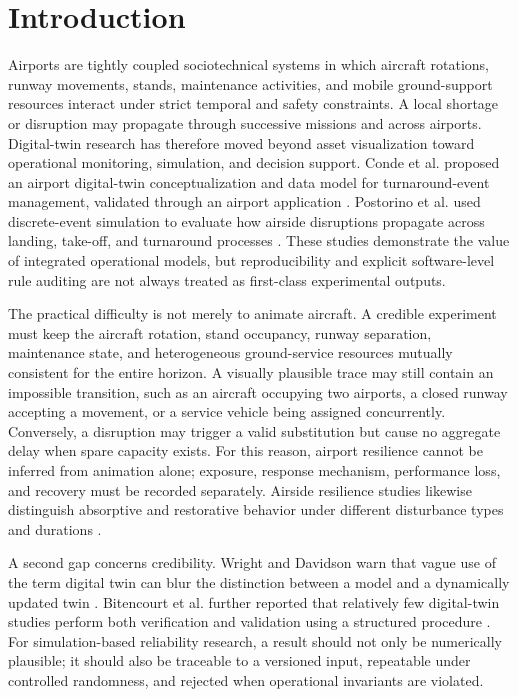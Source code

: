 \documentclass[runningheads]{llncs}
\begin{document}
\section{Introduction}
Airports are tightly coupled sociotechnical systems in which aircraft rotations, runway movements, stands, maintenance activities, and mobile ground-support resources interact under strict temporal and safety constraints. A local shortage or disruption may propagate through successive missions and across airports. Digital-twin research has therefore moved beyond asset visualization toward operational monitoring, simulation, and decision support. Conde et al. proposed an airport digital-twin conceptualization and data model for turnaround-event management, validated through an airport application \cite{conde2022}. Postorino et al. used discrete-event simulation to evaluate how airside disruptions propagate across landing, take-off, and turnaround processes \cite{postorino2020}. These studies demonstrate the value of integrated operational models, but reproducibility and explicit software-level rule auditing are not always treated as first-class experimental outputs.

The practical difficulty is not merely to animate aircraft. A credible experiment must keep the aircraft rotation, stand occupancy, runway separation, maintenance state, and heterogeneous ground-service resources mutually consistent for the entire horizon. A visually plausible trace may still contain an impossible transition, such as an aircraft occupying two airports, a closed runway accepting a movement, or a service vehicle being assigned concurrently. Conversely, a disruption may trigger a valid substitution but cause no aggregate delay when spare capacity exists. For this reason, airport resilience cannot be inferred from animation alone; exposure, response mechanism, performance loss, and recovery must be recorded separately. Airside resilience studies likewise distinguish absorptive and restorative behavior under different disturbance types and durations \cite{mantecchini2023}.

A second gap concerns credibility. Wright and Davidson warn that vague use of the term digital twin can blur the distinction between a model and a dynamically updated twin \cite{wright2020}. Bitencourt et al. further reported that relatively few digital-twin studies perform both verification and validation using a structured procedure \cite{bitencourt2025}. For simulation-based reliability research, a result should not only be numerically plausible; it should also be traceable to a versioned input, repeatable under controlled randomness, and rejected when operational invariants are violated.
\end{document}

